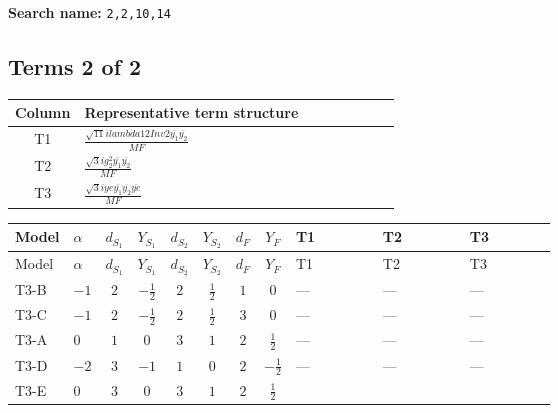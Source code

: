 \documentclass[8pt]{article}
\begin{document}
\begin{landscape}
\begin{longtable}{@{}llcccccc >{\raggedright\arraybackslash}p{0.21\linewidth} >{\raggedright\arraybackslash}p{0.21\linewidth} >{\raggedright\arraybackslash}p{0.21\linewidth}@{}}
\midrule
\bottomrule
\end{longtable}
\clearpage
\noindent\textbf{Search name: }\texttt{2,2,10,14}\par\smallskip
\subsection*{Terms 2 of 2}
\begin{center}
\begin{tabular}{@{}c >{\raggedright\arraybackslash}p{0.82\linewidth}@{}}
\toprule
Column & Representative term structure \\
\midrule
T1 & \(\displaystyle \frac{\sqrt{11} i lambda12Inv2 \overline{y_{1}} \overline{y_{2}}}{MF}\) \\
\midrule
T2 & \(\displaystyle \frac{\sqrt{3} i g_{2}^{2} \overline{y_{1}} \overline{y_{2}}}{MF}\) \\
\midrule
T3 & \(\displaystyle \frac{\sqrt{3} i ye \overline{y_{1}} \overline{y_{2}} \overline{ye}}{MF}\) \\
\midrule
\bottomrule
\end{tabular}
\end{center}
\smallskip
\tiny
\begin{longtable}{@{}llcccccc >{\raggedright\arraybackslash}p{0.21\linewidth} >{\raggedright\arraybackslash}p{0.21\linewidth} >{\raggedright\arraybackslash}p{0.21\linewidth}@{}}
\toprule
Model & $\alpha$ & $d_{S_1}$ & $Y_{S_1}$ & $d_{S_2}$ & $Y_{S_2}$ & $d_F$ & $Y_F$ & T1 & T2 & T3 \\
\midrule
\endfirsthead
\toprule
Model & $\alpha$ & $d_{S_1}$ & $Y_{S_1}$ & $d_{S_2}$ & $Y_{S_2}$ & $d_F$ & $Y_F$ & T1 & T2 & T3 \\
\midrule
\endhead
T3-B & $-1$ & $2$ & $-\frac{1}{2}$ & $2$ & $\frac{1}{2}$ & $1$ & $0$ & --- & --- & --- \\
\midrule
T3-C & $-1$ & $2$ & $-\frac{1}{2}$ & $2$ & $\frac{1}{2}$ & $3$ & $0$ & --- & --- & --- \\
\midrule
T3-A & $0$ & $1$ & $0$ & $3$ & $1$ & $2$ & $\frac{1}{2}$ & --- & --- & --- \\
\midrule
T3-D & $-2$ & $3$ & $-1$ & $1$ & $0$ & $2$ & $-\frac{1}{2}$ & --- & --- & --- \\
\midrule
T3-E & $0$ & $3$ & $0$ & $3$ & $1$ & $2$ & $\frac{1}{2}$ & \scriptsize\adjustbox{max width=\linewidth}{$\begin{gathered} \frac{3 \sqrt{11} i lambda12Inv2 \overline{y_{1}} \overline{y_{2}}}{22 MF}\end{gathered}$} & \scriptsize\adjustbox{max width=\linewidth}{$\begin{gathered} \frac{11 \sqrt{3} i g_{2}^{2} \overline{y_{1}} \overline{y_{2}}}{8 MF}\end{gathered}$} & \scriptsize\adjustbox{max width=\linewidth}{$\begin{gathered} - \frac{\sqrt{3} i ye \overline{y_{1}} \overline{y_{2}} \overline{ye}}{12 MF}\end{gathered}$} \\

\end{longtable}
\end{landscape}
\end{document}
